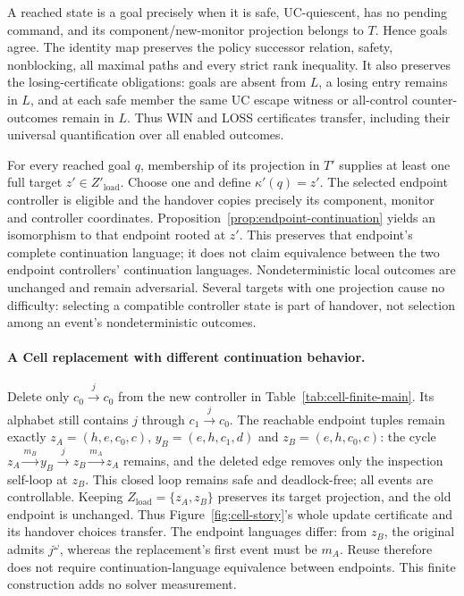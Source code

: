 A reached state is a goal precisely when it is safe, UC-quiescent, has no pending command, and its component/new-monitor projection belongs to $T$. Hence goals agree. The identity map preserves the policy successor relation, safety, nonblocking, all maximal paths and every strict rank inequality. It also preserves the losing-certificate obligations: goals are absent from $L$, a losing entry remains in $L$, and at each safe member the same UC escape witness or all-control counter-outcomes remain in $L$. Thus WIN and LOSS certificates transfer, including their universal quantification over all enabled outcomes.

For every reached goal $q$, membership of its projection in $T'$ supplies at least one full target $z'\in Z'_{\mathrm{load}}$. Choose one and define $\kappa'(q)=z'$. The selected endpoint controller is eligible and the handover copies precisely its component, monitor and controller coordinates. Proposition~\ref{prop:endpoint-continuation} yields an isomorphism to that endpoint rooted at $z'$. This preserves that endpoint's complete continuation language; it does not claim equivalence between the two endpoint controllers' continuation languages. Nondeterministic local outcomes are unchanged and remain adversarial. Several targets with one projection cause no difficulty: selecting a compatible controller state is part of handover, not selection among an event's nondeterministic outcomes.

\paragraph{A Cell replacement with different continuation behavior.}
Delete only $c_0\xrightarrow{j}c_0$ from the new controller in Table~\ref{tab:cell-finite-main}. Its alphabet still contains $j$ through $c_1\xrightarrow{j}c_0$. The reachable endpoint tuples remain exactly $z_A=(h,e,c_0,c)$, $y_B=(e,h,c_1,d)$ and $z_B=(e,h,c_0,c)$: the cycle $z_A\xrightarrow{m_B}y_B\xrightarrow{j}z_B\xrightarrow{m_A}z_A$ remains, and the deleted edge removes only the inspection self-loop at $z_B$. This closed loop remains safe and deadlock-free; all events are controllable. Keeping $Z_{\mathrm{load}}=\{z_A,z_B\}$ preserves its target projection, and the old endpoint is unchanged. Thus Figure~\ref{fig:cell-story}'s whole update certificate and its handover choices transfer. The endpoint languages differ: from $z_B$, the original admits $j^\omega$, whereas the replacement's first event must be $m_A$. Reuse therefore does not require continuation-language equivalence between endpoints. This finite construction adds no solver measurement.

